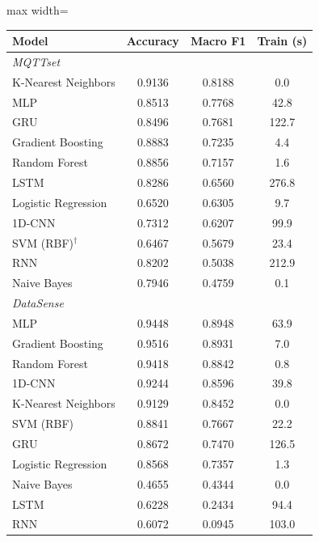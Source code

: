 \begin{adjustbox}{max width=\linewidth}
\begin{tabular}{lccc}
\toprule
Model & Accuracy & Macro F1 & Train (s) \\
\midrule
\textit{MQTTset} & & & \\
\quad K-Nearest Neighbors & 0.9136 & 0.8188 & 0.0 \\
\quad MLP & 0.8513 & 0.7768 & 42.8 \\
\quad GRU & 0.8496 & 0.7681 & 122.7 \\
\quad Gradient Boosting & 0.8883 & 0.7235 & 4.4 \\
\quad Random Forest & 0.8856 & 0.7157 & 1.6 \\
\quad LSTM & 0.8286 & 0.6560 & 276.8 \\
\quad Logistic Regression & 0.6520 & 0.6305 & 9.7 \\
\quad 1D-CNN & 0.7312 & 0.6207 & 99.9 \\
\quad SVM (RBF)$^\dagger$ & 0.6467 & 0.5679 & 23.4 \\
\quad RNN & 0.8202 & 0.5038 & 212.9 \\
\quad Naive Bayes & 0.7946 & 0.4759 & 0.1 \\
\textit{DataSense} & & & \\
\quad MLP & 0.9448 & 0.8948 & 63.9 \\
\quad Gradient Boosting & 0.9516 & 0.8931 & 7.0 \\
\quad Random Forest & 0.9418 & 0.8842 & 0.8 \\
\quad 1D-CNN & 0.9244 & 0.8596 & 39.8 \\
\quad K-Nearest Neighbors & 0.9129 & 0.8452 & 0.0 \\
\quad SVM (RBF) & 0.8841 & 0.7667 & 22.2 \\
\quad GRU & 0.8672 & 0.7470 & 126.5 \\
\quad Logistic Regression & 0.8568 & 0.7357 & 1.3 \\
\quad Naive Bayes & 0.4655 & 0.4344 & 0.0 \\
\quad LSTM & 0.6228 & 0.2434 & 94.4 \\
\quad RNN & 0.6072 & 0.0945 & 103.0 \\
\bottomrule
\end{tabular}
\end{adjustbox}
